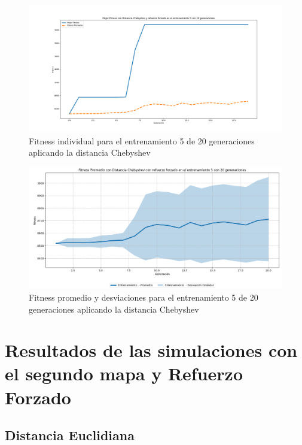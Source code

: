 \documentclass[conference]{IEEEtran}
\begin{document}
\begin{figure}[H]
    \centering
    \includegraphics[width=0.9 \linewidth]{Chebyshev/Fitness_individual_20Gen/Fitness_5_Cheby_20Gen.png}
    \caption{Fitness individual para el entrenamiento 5 de 20 generaciones aplicando la distancia Chebyshev}
    \label{fig:cheb_5_20}
\end{figure}
\begin{figure}[H]
    \centering
    \includegraphics[width=0.9 \linewidth]{Chebyshev/Fitness_individual_20Gen/Fitness_5_Cheby_20Gen_Sombra.png}
    \caption{Fitness promedio y desviaciones para el entrenamiento 5 de 20 generaciones aplicando la distancia Chebyshev}
    \label{fig:cheb_5_20_sombra}
\end{figure}


\section{Resultados de las simulaciones con el segundo mapa y Refuerzo Forzado}
\subsection{Distancia Euclidiana}
\setcounter{figure}{0}
\renewcommand{\thefigure}{S\arabic{figure}-EM2}
\end{document}
